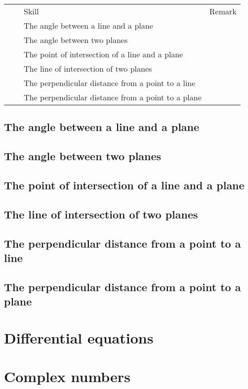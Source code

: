 \begin{center}
\begin{tabular}{|*{4}{l|}}
\hline
\rowcolor{lightgray}  &  & Skill & Remark \tabularnewline
                      &  & The angle between a line and a plane               & \tabularnewline
\hline
                      &  & The angle between two planes                       & \tabularnewline
\hline
                      &  & The point of intersection of a line and a plane    & \tabularnewline
\hline
                      &  & The line of intersection of two planes             & \tabularnewline
\hline
                      &  & The perpendicular distance from a point to a line  & \tabularnewline
\hline
                      &  & The perpendicular distance from a point to a plane & \tabularnewline
\hline
\end{tabular}
\end{center}


\subsection{The angle between a line and a plane}
\subsection{The angle between two planes}


\subsection{The point of intersection of a line and a plane}
\subsection{The line of intersection of two planes}


\subsection{The perpendicular distance from a point to a line}




\subsection{The perpendicular distance from a point to a plane}
   


\section{Differential equations}


\section{Complex numbers}



